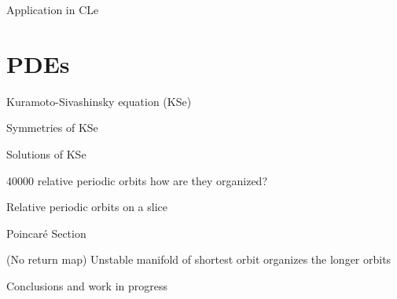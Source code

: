 \begin{frame}{Application in CLe}
 
\end{frame}

\section{PDEs}

\begin{frame}{Kuramoto-Sivashinsky equation (KSe)}
 
\end{frame}

\begin{frame}{Symmetries of KSe}
 
\end{frame}

\begin{frame}{Solutions of KSe}
 
\end{frame}

\begin{frame}{40000 relative periodic orbits}
 how are they organized?
\end{frame}

\begin{frame}{Relative periodic orbits on a slice}
 
\end{frame}

\begin{frame}{Poincar\'e Section}
 
(No return map) Unstable manifold of shortest orbit organizes the longer orbits

\end{frame}

\begin{frame}{Conclusions and work in progress}
 
 
\end{frame}





